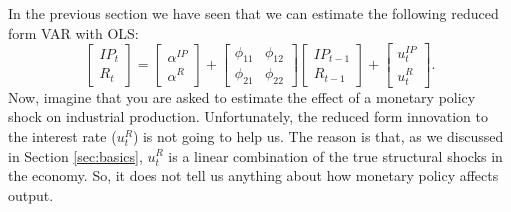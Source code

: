 \documentclass[10pt]{article}
\begin{document}
In the previous section we have seen that we can estimate the following
reduced form VAR with OLS:%
\begin{equation}
\begin{bmatrix}
IP_{t} \\
R_{t}%
\end{bmatrix}%
=%
\begin{bmatrix}
\alpha ^{IP} \\
\alpha ^{R}%
\end{bmatrix}%
+\left[
\begin{array}{cc}
\phi _{11} & \phi _{12} \\
\phi _{21} & \phi _{22}%
\end{array}%
\right]
\begin{bmatrix}
IP_{t-1} \\
R_{t-1}%
\end{bmatrix}%
+%
\begin{bmatrix}
u_{t}^{IP} \\
u_{t}^{R}%
\end{bmatrix}%
.  \label{eq:red_2var}
\end{equation}%
Now, imagine that you are asked to estimate the effect of a monetary policy
shock on industrial production. Unfortunately, the reduced form innovation
to the interest rate ($u_{t}^{R}$) is not going to help us. The reason is
that, as we discussed in Section \ref{sec:basics}, $u_{t}^{R}$ is a linear
combination of the true structural shocks in the economy. So, it does not
tell us anything about how monetary policy affects output.
\end{document}
